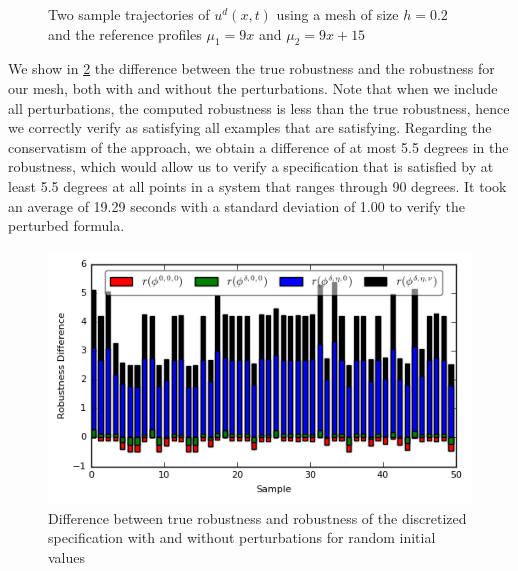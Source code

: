 \documentclass[letterpaper, 10 pt, conference]{ieeeconf/ieeeconf}
\begin{document}
\begin{figure}[!t]
    \centering 
        \hfill
        \hfill
        \caption{Two sample trajectories of $u^d(x, t)$ using a mesh of size
        $h=0.2$ and the reference profiles $\mu_1 = 9x$ and $\mu_2 = 9x + 15$}
    \label{fig:ex2_evolution}
\end{figure}


We show in \cref{fig:res_diffs} the difference between the true robustness and
the robustness for our mesh, both with and without the perturbations. Note that
when we include all perturbations, the computed robustness is less than the true
robustness, hence we correctly verify as satisfying all examples
that are satisfying. Regarding the conservatism of the approach, we obtain a
difference of at most 5.5 degrees in the robustness, which would allow us to verify a
specification that is satisfied by at least 5.5 degrees at all points in a system
that ranges through 90 degrees. It took an average of 19.29 seconds with a
standard deviation of 1.00 to verify the perturbed formula.

\begin{figure}
    \centering
    \includegraphics[width=0.8\linewidth]{figures/cs_ran_init_results.png}
    \caption{Difference between true robustness and robustness of the
        discretized specification with and without perturbations for
        random initial values}
    \label{fig:res_diffs}
\end{figure}
\end{document}
